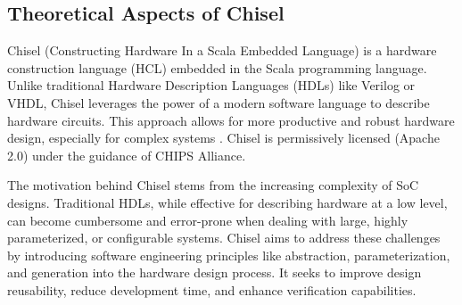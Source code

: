 \subsection{Theoretical Aspects of Chisel}
\label{sec:chisel_theoretical}
Chisel (Constructing Hardware In a Scala Embedded Language) is a hardware construction language (HCL) embedded in the Scala programming language. Unlike traditional Hardware Description Languages (HDLs) like Verilog or VHDL, Chisel leverages the power of a modern software language to describe hardware circuits. This approach allows for more productive and robust hardware design, especially for complex systems \cite{bachrach2012chisel}. Chisel is permissively licensed (Apache 2.0) under the guidance of CHIPS Alliance.

The motivation behind Chisel stems from the increasing complexity of SoC designs. Traditional HDLs, while effective for describing hardware at a low level, can become cumbersome and error-prone when dealing with large, highly parameterized, or configurable systems. Chisel aims to address these challenges by introducing software engineering principles like abstraction, parameterization, and generation into the hardware design process. It seeks to improve design reusability, reduce development time, and enhance verification capabilities.


